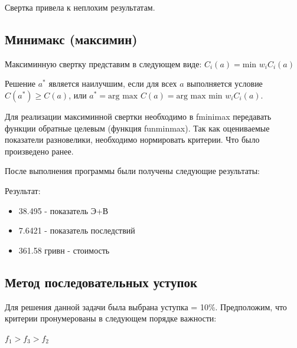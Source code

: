 \documentclass[14pt,a4paper,report]{report}
\begin{document}
Свертка привела к неплохим результатам. 


























\subsection{Минимакс (максимин)}
Максиминную свертку представим в следующем виде: $C_i(a)= \text{min } w_i C_i(a)$

Решение $a^*$ является наилучшим, если для всех $a$ выполняется условие $C(a^*) \geq C(a)$, или $a^* = \text{arg max } C(a) = \text{arg max min } w_i C_i (a)$.

Для реализации максиминной свертки необходимо в fminimax передавать функции обратные целевым (функция funminmax). Так как оцениваемые показатели разновелики, необходимо нормировать критерии. Что было произведено ранее.


После выполнения программы были получены следующие результаты:


Результат:
\begin{itemize}
\item 38.495 - показатель Э+В
\item 7.6421 - показатель последствий
\item 361.58 гривн - стоимость 
\end{itemize}































\subsection{Метод последовательных уступок}
Для решения данной задачи была выбрана уступка = 10\%. 	Предположим, что критерии пронумерованы в следующем порядке важности:
\begin{center}
$f_1>f_3>f_2$
\end{center} 
\end{document}
